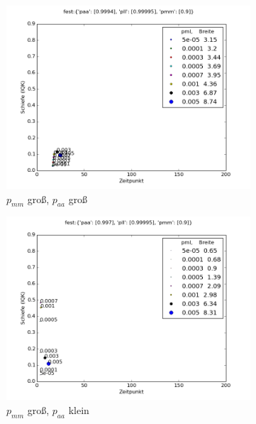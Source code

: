 \begin{figure}
\begin{subfigure}[t]{0.5\textwidth}
\includegraphics[width=\textwidth]{bilder/pml/pml_09_p_09994_099995}
\caption{$p_{mm}$ groß, $p_{aa}$ groß}
\end{subfigure}
\begin{subfigure}[t]{0.5\textwidth}
\includegraphics[width=\textwidth]{bilder/pml/pml_09_p_0997_099995}
\caption{$p_{mm}$ groß, $p_{aa}$ klein}
\end{subfigure}
\vspace*{7mm}
\begin{subfigure}[b]{0.5\textwidth}

\end{subfigure}
\end{figure}
